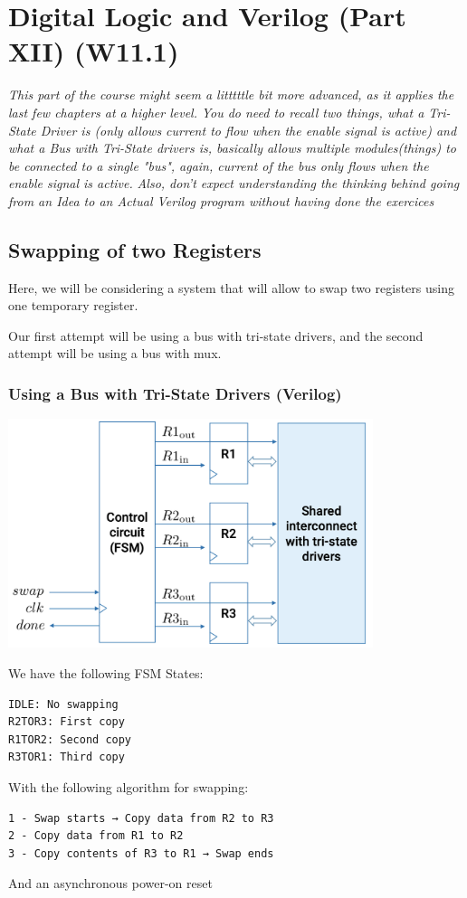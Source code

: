 \documentclass[12pt,openany]{book}
\begin{document}
\chapter{Digital Logic and Verilog (Part XII) (W11.1)}
\textit{This part of the course might seem a litttttle bit more advanced, as it applies the last few chapters at a higher level.} \newline 
\textit{You do need to recall two things, what a Tri-State Driver is (only allows current to flow when the enable signal is active) and what a Bus with Tri-State drivers is, basically allows multiple modules(things) to be connected to a single "bus", again, current of the bus only flows when the enable signal is active.}
\newline
\textit{Also, don't expect understanding the thinking behind going from an Idea to an Actual Verilog program without having done the exercices}
\section{Swapping of two Registers}
Here, we will be considering a system that will allow to swap two registers using one temporary register.

Our first attempt will be using a bus with tri-state drivers, and the second attempt will be using a bus with mux.
\subsection{Using a Bus with Tri-State Drivers (Verilog)}

\begin{minipage}[htp]{0.6\textwidth}
	\begin{center}
		\includegraphics[width=0.8\textwidth]{circuits/18.1.1.png}
	\end{center}
\end{minipage}
\hfill
\vline
\hfill
\begin{minipage}[htp]{0.3\textwidth}
We have the following FSM States:
\begin{verbatim}
IDLE: No swapping
R2TOR3: First copy
R1TOR2: Second copy
R3TOR1: Third copy
\end{verbatim}	
\end{minipage}
\newline
With the following algorithm for swapping:
\begin{verbatim}
1 - Swap starts → Copy data from R2 to R3
2 - Copy data from R1 to R2
3 - Copy contents of R3 to R1 → Swap ends
\end{verbatim}
And an asynchronous power-on reset
\end{document}
